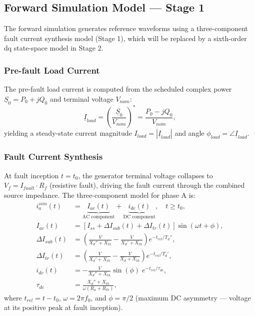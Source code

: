 \documentclass[12pt, a4paper]{article}
\theoremstyle{definition}
\theoremstyle{plain}
\begin{document}
\subsection{Forward Simulation Model — Stage 1}
\label{sec:system:forward}

The forward simulation generates reference waveforms using a three-component
fault current synthesis model (Stage 1), which will be replaced by a
sixth-order dq state-space model in Stage 2.

\subsubsection{Pre-fault Load Current}

The pre-fault load current is computed from the scheduled complex power
$\underline{S}_0 = P_0 + jQ_0$ and terminal voltage $V_{nom}$:
\begin{equation}
  \underline{I}_{load} = \left(\frac{\underline{S}_0}{V_{nom}}\right)^* =
  \frac{P_0 - jQ_0}{V_{nom}},
  \label{eq:prefault}
\end{equation}
yielding a steady-state current magnitude $I_{load} = |\underline{I}_{load}|$
and angle $\phi_{load} = \angle \underline{I}_{load}$.

\subsubsection{Fault Current Synthesis}

At fault inception $t = t_0$, the generator terminal voltage collapses to
$V_f = I_{fault} \cdot R_f$ (resistive fault), driving the fault current
through the combined source impedance.  The three-component model for phase A is:
\begin{align}
  i_a^{sim}(t) &= \underbrace{I_{ac}(t)}_{\text{AC component}}
                + \underbrace{i_{dc}(t)}_{\text{DC component}},
                \quad t \geq t_0,
  \label{eq:total_current} \\[4pt]
  I_{ac}(t)  &= \left[I_{ss} + \Delta I_{sub}(t) + \Delta I_{tr}(t)\right]
                \sin(\omega t + \phi),
  \label{eq:ac_component} \\[4pt]
  \Delta I_{sub}(t) &= \left(\frac{V}{X_d'' + X_{th}} - \frac{V}{X_d' + X_{th}}\right)
                       e^{-t_{rel}/T_d''},
  \label{eq:sub_term} \\[4pt]
  \Delta I_{tr}(t)  &= \left(\frac{V}{X_d' + X_{th}} - \frac{V}{X_d + X_{th}}\right)
                       e^{-t_{rel}/T_d'},
  \label{eq:tr_term} \\[4pt]
  i_{dc}(t) &= -\frac{V}{X_d'' + X_{th}} \sin(\phi)\; e^{-t_{rel}/\tau_{dc}},
  \label{eq:dc_term} \\[4pt]
  \tau_{dc} &= \frac{X_d'' + X_{th}}{\omega (R_a + R_{th})},
  \label{eq:taudc_phys}
\end{align}
where $t_{rel} = t - t_0$, $\omega = 2\pi f_0$, and $\phi = \pi/2$ (maximum
DC asymmetry — voltage at its positive peak at fault inception).
\end{document}
